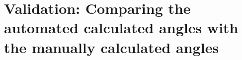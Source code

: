 %
%
%
%

\section{Validation: Comparing the automated calculated angles with the manually calculated angles}

